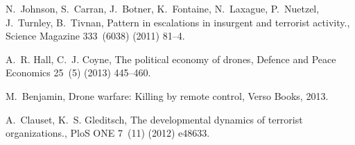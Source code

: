 \documentclass[preprint,12pt]{elsarticle}
\begin{document}
\begin{thebibliography}{10}
N.~Johnson, S.~Carran, J.~Botner, K.~Fontaine, N.~Laxague, P.~Nuetzel,
  J.~Turnley, B.~Tivnan, {Pattern in escalations in insurgent and terrorist
  activity.}, Science Magazine 333~(6038) (2011) 81--4.

A.~R. Hall, C.~J. Coyne, {The political economy of drones}, Defence and Peace
  Economics 25~(5) (2013) 445--460.

M.~Benjamin, Drone warfare: Killing by remote control, Verso Books, 2013.

A.~Clauset, K.~S. Gleditsch, {The developmental dynamics of terrorist
  organizations.}, PloS ONE 7~(11) (2012) e48633.

\end{thebibliography}
\end{document}
